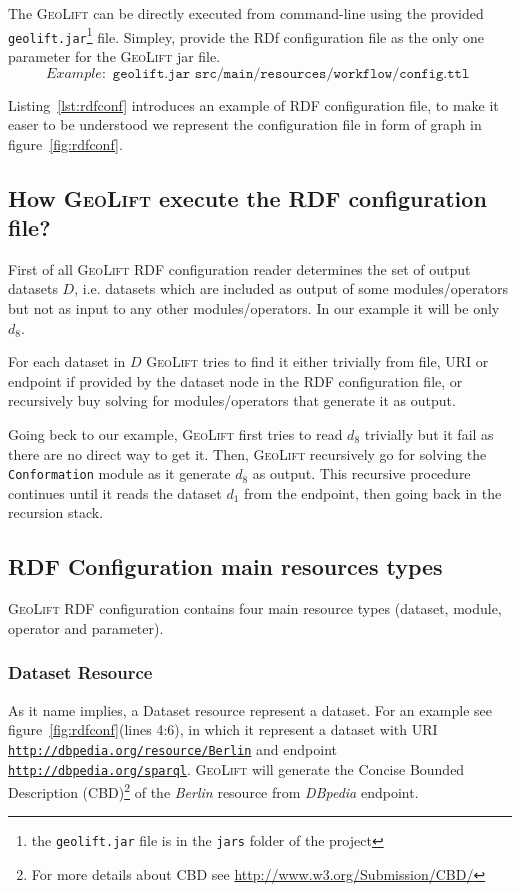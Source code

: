 \documentclass[a4paper,twoside,bibtotoc,abstracton,12pt,BCOR=15mm]{article}
\newcommand{\geolift}{\textsc{GeoLift}\xspace}
\begin{document}
The \geolift can be directly executed from command-line using the provided \texttt{geolift.jar}\footnote{the \texttt{geolift.jar} file is in the \texttt{jars} folder of the project} file.
Simpley, provide the RDf configuration file as the only one parameter for the \geolift jar file.
\begin{equation*}
  Example: \texttt{ geolift.jar src/main/resources/workflow/config.ttl }
\end{equation*}



Listing~\ref{lst:rdfconf} introduces an example of RDF configuration file, to make it easer to be understood we represent the configuration file in form of graph in figure~\ref{fig:rdfconf}.

\subsection{How \geolift execute the RDF configuration file?}
First of all \geolift RDF configuration reader determines the set of output datasets $D$, 
i.e. datasets which are included as output of some modules/operators but not as input to any other modules/operators.
In our example it will be only $d_8$.

For each dataset in $D$ \geolift tries to find it either trivially from file, URI or endpoint if provided by the dataset node in the RDF configuration file, 
or recursively buy solving for modules/operators that generate it as output.

Going beck to our example, \geolift first tries to read $d_8$ trivially but it fail as there are no direct way to get it. 
Then, \geolift recursively go for solving the \texttt{Conformation} module as it generate $d_8$ as output. 
This recursive procedure continues until it reads the dataset $d_1$ from the endpoint, then going back in the recursion stack.

\subsection{RDF Configuration main resources types}
\geolift RDF configuration contains four main resource types (dataset, module, operator and parameter).

\subsubsection{Dataset Resource}
    As it name implies, a Dataset resource represent a dataset. 
    For an example see figure~\ref{fig:rdfconf}(lines 4:6), in which it represent a dataset with URI \texttt{\url{http://dbpedia.org/resource/Berlin}} and endpoint \texttt{\url{http://dbpedia.org/sparql}}.
    \geolift will generate the Concise Bounded Description (CBD)\footnote{For more details about CBD see \url{http://www.w3.org/Submission/CBD/}} of the \emph{Berlin} resource from \emph{DBpedia} endpoint. 
\end{document}
